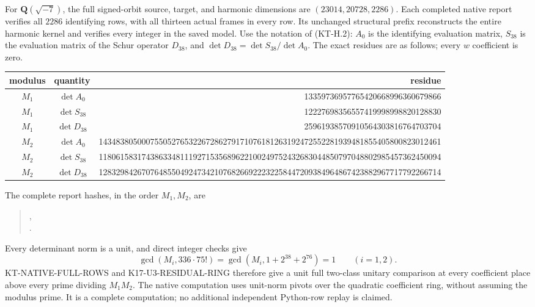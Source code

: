 \documentclass[11pt,a4paper]{article}
\theoremstyle{definition}
\begin{document}
For $\mathbf Q(\sqrt{-7})$, the full signed-orbit source, target,
and harmonic dimensions are $(23014,20728,2286)$.
Each completed native report verifies all $2286$ identifying
rows, with all thirteen actual frames in every row.  Its
unchanged structural prefix reconstructs the entire harmonic
kernel and verifies every integer in the saved model.
Use the notation of (KT-H.2): $A_0$ is the identifying
evaluation matrix, $S_{38}$ is the evaluation matrix of the
Schur operator $D_{38}$, and
$\det D_{38}=\det S_{38}/\det A_0$.
The exact residues are as follows; every $w$ coefficient is zero.
\begin{center}\scriptsize\setlength{\tabcolsep}{4pt}
\begin{tabular}{c|c|r}
modulus&quantity&residue\\\hline
$M_1$&$\det A_0$&13359736957765420668996360679866\\
$M_1$&$\det S_{38}$&12227698356557419998998820128830\\
$M_1$&$\det D_{38}$&25961938570910564303816764703704\\
$M_2$&$\det A_0$&14348380500075505276532267286279171076181263192472552281939481855405800823012461\\
$M_2$&$\det S_{38}$&11806158317438633481119271535689622100249752432683044850797048802985457362450094\\
$M_2$&$\det D_{38}$&12832984267076485504924734210768266922232258447209384964867423882967717792266714
\end{tabular}
\end{center}
The complete report hashes, in the order $M_1,M_2$, are
\begin{quote}\small
{},\\
.
\end{quote}
Every determinant norm is a unit, and direct integer checks give
\[
 \gcd(M_i,336\cdot75!)=
 \gcd(M_i,1+2^{38}+2^{76})=1\qquad(i=1,2).                \tag{KF38.4}
\]
KT-NATIVE-FULL-ROWS and K17-U3-RESIDUAL-RING therefore give
a unit full two-class unitary comparison at every coefficient
place above every prime dividing $M_1M_2$.  The native
computation uses unit-norm pivots over the quadratic coefficient
ring, without assuming the modulus prime.  It is a complete
computation; no additional independent Python-row replay is
claimed.
\end{document}
